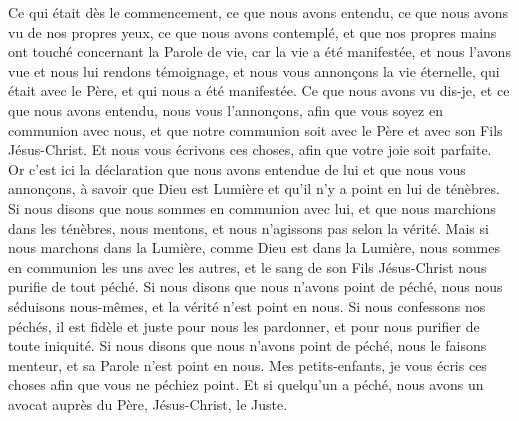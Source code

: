\begin{multicols}{2}
\VerseOne{}Ce qui était dès le commencement, ce que nous avons entendu, ce que nous avons vu de nos propres yeux, ce que nous avons contemplé, et que nos propres mains ont touché concernant la Parole de vie,
car la vie a été manifestée, et nous l'avons vue et nous lui rendons témoignage, et nous vous annonçons la vie éternelle, qui était avec le Père, et qui nous a été manifestée.
Ce que nous avons vu dis-je, et ce que nous avons entendu, nous vous l'annonçons, afin que vous soyez en communion avec nous, et que notre communion soit avec le Père et avec son Fils Jésus-Christ.
Et nous vous écrivons ces choses, afin que votre joie soit parfaite.
Or c'est ici la déclaration que nous avons entendue de lui et que nous vous annonçons, à savoir que Dieu est Lumière et qu'il n'y a point en lui de ténèbres.
Si nous disons que nous sommes en communion avec lui, et que nous marchions dans les ténèbres, nous mentons, et nous n'agissons pas selon la vérité.
Mais si nous marchons dans la Lumière, comme Dieu est dans la Lumière, nous sommes en communion les uns avec les autres, et le sang de son Fils Jésus-Christ nous purifie de tout péché.
Si nous disons que nous n'avons point de péché, nous nous séduisons nous-mêmes, et la vérité n'est point en nous.
Si nous confessons nos péchés, il est fidèle et juste pour nous les pardonner, et pour nous purifier de toute iniquité.
Si nous disons que nous n'avons point de péché, nous le faisons menteur, et sa Parole n'est point en nous.
\VerseOne{}Mes petits-enfants, je vous écris ces choses afin que vous ne péchiez point. Et si quelqu'un a péché, nous avons un avocat{} auprès du Père, Jésus-Christ, le Juste.

\end{multicols}
